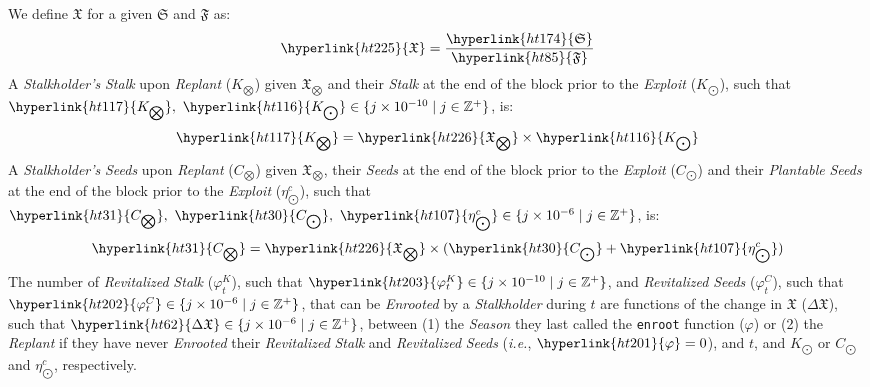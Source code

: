 \documentclass[tikz]{article}
\newcommand{\code}[1]{\texttt{#1}}
\newcommand{\term}[1]{\textsl{#1}}
\begin{document}
We define \hyperlink{ht225}{$\mathfrak{X}$} for a given \hyperlink{ht174}{$\mathfrak{S}$} and \hyperlink{ht85}{$\mathfrak{F}$} as:
$$\hyperlink{ht225}{\mathfrak{X}} = \frac{\hyperlink{ht174}{\mathfrak{S}}}{\hyperlink{ht85}{\mathfrak{F}}}$$
A \term{Stalkholder's} \term{Stalk} upon \term{Replant} (\hyperlink{ht117}{$K_{\bigotimes}$}) given \hyperlink{ht226}{$\mathfrak{X}_{\bigotimes}$} and their \term{Stalk} at the end of the block prior to the \term{Exploit} (\hyperlink{ht116}{$K_{\bigodot}$}), such that $\hyperlink{ht117}{K_{\bigotimes}},\ \hyperlink{ht116}{K_{\bigodot}} \in \{j \times 10^{-10} \mid j \in \mathbb{Z}^{+} \}$, is:
$$\hyperlink{ht117}{K_{\bigotimes}} = \hyperlink{ht226}{\mathfrak{X}_{\bigotimes}} \times \hyperlink{ht116}{K_{\bigodot}}$$
A \term{Stalkholder's} \term{Seeds} upon \term{Replant} (\hyperlink{ht31}{$C_{\bigotimes}$}) given \hyperlink{ht226}{$\mathfrak{X}_{\bigotimes}$}, their \term{Seeds} at the end of the block prior to the \term{Exploit} (\hyperlink{ht30}{$C_{\bigodot}$}) and their \term{Plantable} \term{Seeds} at the end of the block prior to the \term{Exploit} (\hyperlink{ht107}{$\eta_{\bigodot}^c$}), such that $\hyperlink{ht31}{C_{\bigotimes}},\ \hyperlink{ht30}{C_{\bigodot}},\ \hyperlink{ht107}{\eta_{\bigodot}^c} \in \{j \times 10^{-6} \mid j \in \mathbb{Z}^{+} \}$, is:
$$\hyperlink{ht31}{C_{\bigotimes}} = \hyperlink{ht226}{\mathfrak{X}_{\bigotimes}} \times (\hyperlink{ht30}{C_{\bigodot}} + \hyperlink{ht107}{\eta_{\bigodot}^c})$$
The number of \term{Revitalized} \term{Stalk} (\hyperlink{ht203}{${\varphi}_t^K$}), such that $\hyperlink{ht203}{{\varphi}_t^K} \in \{j \times 10^{-10} \mid j \in \mathbb{Z}^{+} \}$, and \term{Revitalized} \term{Seeds} (\hyperlink{ht202}{${\varphi}_t^C$}), such that $\hyperlink{ht202}{{\varphi}_t^C} \in \{j \times 10^{-6} \mid j \in \mathbb{Z}^{+} \}$, that can be \term{Enrooted} by a \term{Stalkholder} during \hyperlink{ht204}{$t$} are functions of the change in \hyperlink{ht225}{$\mathfrak{X}$} (\hyperlink{ht62}{$\Delta \mathfrak{X}$}), such that $\hyperlink{ht62}{\Delta \mathfrak{X}} \in \{j \times 10^{-6} \mid j \in \mathbb{Z}^{+} \}$, between (1) the \term{Season} they last called the \code{enroot} function (\hyperlink{ht201}{$\varphi$}) or (2) the \term{Replant} if they have never \term{Enrooted} their \term{Revitalized} \term{Stalk} and \term{Revitalized} \term{Seeds} (\term{i.e.}, $\hyperlink{ht201}{\varphi} = 0$), and \hyperlink{ht204}{$t$}, and \hyperlink{ht116}{$K_{\bigodot}$} or \hyperlink{ht30}{$C_{\bigodot}$} and \hyperlink{ht107}{$\eta_{\bigodot}^c$}, respectively. 
\end{document}
